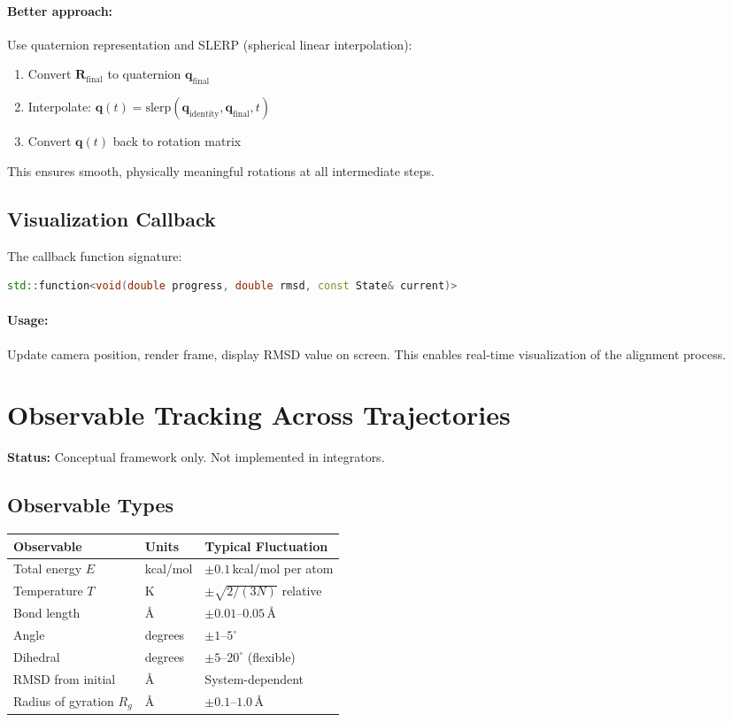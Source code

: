 \documentclass[11pt]{article}
\begin{document}
\paragraph{Better approach:} Use quaternion representation and SLERP (spherical linear interpolation):
\begin{enumerate}
\item Convert $\mathbf{R}_{\text{final}}$ to quaternion $\mathbf{q}_{\text{final}}$
\item Interpolate: $\mathbf{q}(t) = \text{slerp}(\mathbf{q}_{\text{identity}}, \mathbf{q}_{\text{final}}, t)$
\item Convert $\mathbf{q}(t)$ back to rotation matrix
\end{enumerate}

This ensures smooth, physically meaningful rotations at all intermediate steps.

\subsection{Visualization Callback}

The callback function signature:
\begin{lstlisting}[language=C++]
std::function<void(double progress, double rmsd, const State& current)>
\end{lstlisting}

\paragraph{Usage:} Update camera position, render frame, display RMSD value on screen. This enables real-time visualization of the alignment process.

\section{Observable Tracking Across Trajectories}

\textbf{Status:} Conceptual framework only. Not implemented in integrators.

\subsection{Observable Types}

\begin{center}
\begin{tabular}{lll}
\toprule
Observable & Units & Typical Fluctuation \\
\midrule
Total energy $E$ & kcal/mol & $\pm 0.1$\,kcal/mol per atom \\
Temperature $T$ & K & $\pm \sqrt{2/(3N)}$ relative \\
Bond length & \AA & $\pm 0.01$--$0.05$\,\AA \\
Angle & degrees & $\pm 1$--$5^\circ$ \\
Dihedral & degrees & $\pm 5$--$20^\circ$ (flexible) \\
RMSD from initial & \AA & System-dependent \\
Radius of gyration $R_g$ & \AA & $\pm 0.1$--$1.0$\,\AA \\
\bottomrule
\end{tabular}
\end{center}
\end{document}
